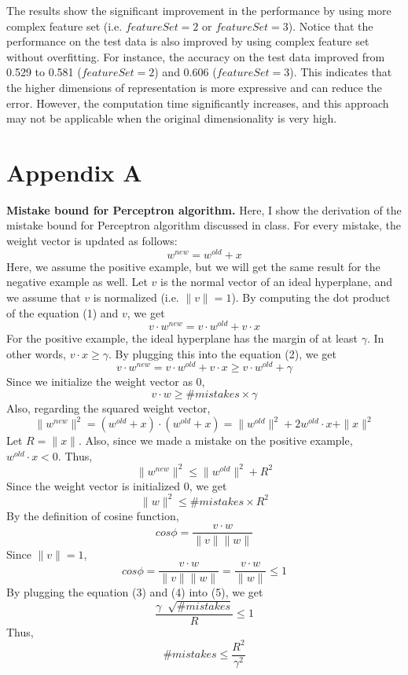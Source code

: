 The results show the significant improvement in the performance by using more complex feature set (i.e. $featureSet = 2$ or $featureSet = 3$). Notice that the performance on the test data is also improved by using complex feature set without overfitting. For instance, the accuracy on the test data improved from 0.529 to 0.581 ($featureSet=2$) and 0.606 ($featureSet=3$). This indicates that the higher dimensions of representation is more expressive and can reduce the error. However, the computation time significantly increases, and this approach may not be applicable when the original dimensionality is very high.

\section*{Appendix A}
{\bf Mistake bound for Perceptron algorithm.} Here, I show the derivation of the mistake bound for Perceptron algorithm discussed in class. For every mistake, the weight vector is updated as follows:
\begin{equation}
w^{new}=w^{old}+x
\end{equation}
Here, we assume the positive example, but we will get the same result for the negative example as well. Let $v$ is the normal vector of an ideal hyperplane, and we assume that $v$ is normalized (i.e. $\|v\|=1$). By computing the dot product of the equation (1) and $v$, we get
\begin{equation}
v \cdot w^{new}=v \cdot w^{old}+v \cdot x
\end{equation}
For the positive example, the ideal hyperplane has the margin of at least $\gamma$. In other words, $v \cdot x \ge \gamma$. By plugging this into the equation (2), we get
\[
v \cdot w^{new}=v \cdot w^{old}+v \cdot x \ge v \cdot w^{old} + \gamma
\]
Since we initialize the weight vector as 0,
\begin{equation}
v \cdot w \ge \#mistakes \times \gamma
\end{equation}
Also, regarding the squared weight vector,
\[
\|w^{new}\|^2=(w^{old}+x) \cdot (w^{old}+x) =\|w^{old}\|^2 + 2w^{old} \cdot x + \|x\|^2
\]
Let $R=\|x\|$. Also, since we made a mistake on the positive example, $w^{old} \cdot x < 0$. Thus,
\[
\|w^{new}\|^2 \le \|w^{old}\|^2 + R^2
\]
Since the weight vector is initialized 0, we get
\begin{equation}
\|w\|^2 \le \#mistakes \times R^2
\end{equation}
By the definition of cosine function,
\[
cos \phi = \frac{v \cdot w}{\|v\|\|w\|}
\]
Since $\|v\|=1$,
\begin{equation}
cos \phi = \frac{v \cdot w}{\|v\|\|w\|}=\frac{v \cdot w}{\|w\|} \le 1
\end{equation}
By plugging the equation (3) and (4) into (5), we get
\[
\frac{\gamma \; \sqrt[]{\#mistakes}}{R} \le 1
\]
Thus,
\begin{equation}
\# mistakes \le \frac{R^2}{\gamma^2}
\end{equation}



